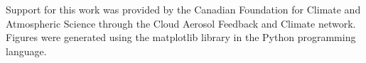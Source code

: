 \documentclass[draft,grl]{AGUTeX}
\begin{document}
\begin{article}
%
%
%
%

\begin{acknowledgments}
Support for this work was provided by the Canadian Foundation for Climate and 
Atmospheric Science through the Cloud Aerosol Feedback and Climate network.
Figures were generated using the matplotlib library in the Python
programming language.
\end{acknowledgments}

%
%
%
%
%
%
%
%
%
%








\end{article}
\end{document}
